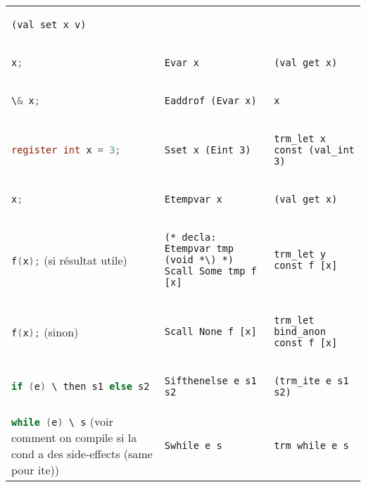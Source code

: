 \documentclass[class=scrartcl,border={0cm 1.5cm 1cm -0.5cm},multi={tabular}]{standalone}
\theoremstyle{break}
\newcommand{\clst}[1]{\lstinline[language=C]!#1!}
\begin{document}
\begin{tabular}{p{6cm}p{10cm}p{10cm}}
\begin{lstlisting}
(val_set x v)
\end{lstlisting} \\
  \clst{x;} &
\begin{lstlisting}
Evar x
\end{lstlisting} &
\begin{lstlisting}
(val_get x)
\end{lstlisting} \\
  \clst{\& x;} &
\begin{lstlisting}
Eaddrof (Evar x)
\end{lstlisting} &
\begin{lstlisting}
x
\end{lstlisting} \\
  \midrule
  \clst{register int x = 3;} &
\begin{lstlisting}
Sset x (Eint 3)
\end{lstlisting} &
\begin{lstlisting}
trm_let x const (val_int 3)
\end{lstlisting} \\
\clst{x;} &
\begin{lstlisting}
Etempvar x
\end{lstlisting} &
\begin{lstlisting}
(val_get x)
\end{lstlisting} \\
  \midrule
\clst{f(x);} (si résultat utile) &
\begin{lstlisting}
(* decla: Etempvar tmp (void *\) *)
Scall Some tmp f [x]
\end{lstlisting} &
\begin{lstlisting}
trm_let y const f [x]
\end{lstlisting} \\
  \midrule
\clst{f(x);} (sinon) &
\begin{lstlisting}
Scall None f [x]
\end{lstlisting} &
\begin{lstlisting}
trm_let bind_anon const f [x]
\end{lstlisting} \\
  \midrule
\clst{if (e) \ then s1 else s2} &
\begin{lstlisting}
Sifthenelse e s1 s2
\end{lstlisting} &
\begin{lstlisting}
(trm_ite e s1 s2)
\end{lstlisting} \\
  \midrule
\clst{while (e) \ s} (voir comment on compile si la cond a des
  side-effects (same pour ite)) &
\begin{lstlisting}
Swhile e s
\end{lstlisting} &
\begin{lstlisting}
trm_while e s
\end{lstlisting} \\
  \bottomrule
\end{tabular}
\end{document}

